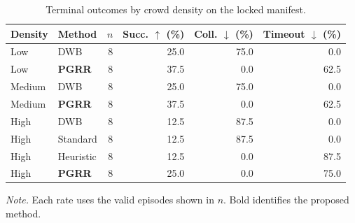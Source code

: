 \begin{table}[t]
\caption{Terminal outcomes by crowd density on the locked manifest.}
\label{tab:density-results}
\centering
\footnotesize
\setlength{\tabcolsep}{3.5pt}
\renewcommand{\arraystretch}{1.08}
\begin{tabular}{@{}llrrrr@{}}
\toprule
Density & Method & $n$ & Succ. $\uparrow$ (\%) & Coll. $\downarrow$ (\%)
& Timeout $\downarrow$ (\%) \\
\midrule
Low & DWB & 8 & 25.0 & 75.0 & 0.0 \\
Low & \textbf{PGRR} & 8 & 37.5 & 0.0 & 62.5 \\
\addlinespace[2pt]
Medium & DWB & 8 & 25.0 & 75.0 & 0.0 \\
Medium & \textbf{PGRR} & 8 & 37.5 & 0.0 & 62.5 \\
\addlinespace[2pt]
High & DWB & 8 & 12.5 & 87.5 & 0.0 \\
High & Standard & 8 & 12.5 & 87.5 & 0.0 \\
High & Heuristic & 8 & 12.5 & 0.0 & 87.5 \\
High & \textbf{PGRR} & 8 & 25.0 & 0.0 & 75.0 \\
\bottomrule
\end{tabular}
\vspace{2pt}

\parbox{0.98\columnwidth}{\footnotesize \emph{Note.} Each rate uses the valid episodes
shown in $n$. Bold identifies the proposed method.}
\end{table}
